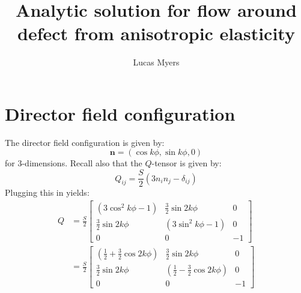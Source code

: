 \documentclass[reqno]{article}
\begin{document}
\title{Analytic solution for flow around defect from anisotropic elasticity}
\author{Lucas Myers}
\maketitle

\section{Director field configuration}
The director field configuration is given by:
\begin{equation}
  \mathbf{n} = \left( \cos k\phi, \sin k\phi, 0 \right)
\end{equation}
for 3-dimensions.
Recall also that the $Q$-tensor is given by:
\begin{equation}
  Q_{ij} = \frac{S}{2} \left( 3 n_i n_j - \delta_{ij} \right)
\end{equation}
Plugging this in yields:
\begin{equation}
  \begin{split}
    Q &= \frac{S}{2} \begin{bmatrix}
      \left(3 \cos^{2}k\phi - 1\right)
      & \tfrac32 \sin 2k \phi
      & 0 \\
      \tfrac32 \sin 2k \phi
      & \left(3 \sin^{2}k\phi - 1\right)
      & 0 \\
      0
      & 0
      & -1
    \end{bmatrix} \\
    &= \frac{S}{2} \begin{bmatrix}
      \left(\tfrac12 + \tfrac32 \cos 2k\phi\right)
      & \tfrac32 \sin 2k \phi
      & 0 \\
      \tfrac32 \sin 2k \phi
      & \left(\tfrac12 - \tfrac32 \cos 2k\phi \right)
      & 0 \\
      0
      & 0
      & -1
    \end{bmatrix}
  \end{split}
\end{equation}
\end{document}

